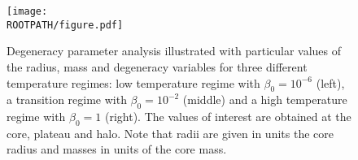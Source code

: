 \begin{figure}%
	\centering%
	\texttt{[image: \\ROOTPATH/figure.pdf]}
	\caption{Degeneracy parameter analysis illustrated with particular values of the radius, mass and degeneracy variables for three different temperature regimes: low temperature regime with $\beta_0 = 10^{-6}$ (left), a transition regime with $\beta_0 = 10^{-2}$ (middle) and a high temperature regime with $\beta_0 = 1$ (right). The values of interest are obtained at the core, plateau and halo. Note that radii are given in units the core radius and masses in units of the core mass.}%
	\label{fig:analysis:without-cutoff:central-degeneracy}%
\end{figure}